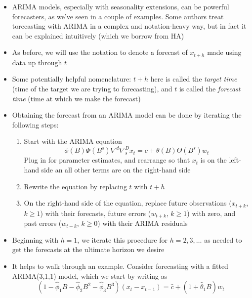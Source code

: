 \documentclass{article}
\begin{document}
\begin{itemize}
\item ARIMA models, especially with seasonality extensions, can be powerful 
  forecasters, as we've seen in a couple of examples. Some authors treat
  torecasting with ARIMA in a complex and notation-heavy way, but in fact it can
  be explained intuitively (which we borrow from HA)

\item As before, we will use the notation  to denote
  a forecast of $x_{t+h}$ made using data up through $t$

\item Some potentially helpful nomenclature: $t+h$ here is called the
  \emph{target time} (time of the target we are trying to forecasting), and $t$
  is called the \emph{forecast time} (time at which we make the forecast) 

\item Obtaining the forecast  from an ARIMA model can 
  be done by iterating the following steps: 

\begin{enumerate}
\item Start with the ARIMA equation
  \[
  \phi(B) \Phi(B^s) \nabla^d \nabla_s^D x_t = c + \theta(B) \Theta(B^s) w_t   
  \]
  Plug in for parameter estimates, and rearrange so that $x_t$ is on the
  left-hand side an all other terms are on the right-hand side 

\item Rewrite the equation by replacing $t$ with $t+h$

\item On the right-hand side of the equation, replace future observations
  ($x_{t+k}$, $k \geq 1$) with their forecasts, future errors ($w_{t+k}$, $k
  \geq 1$) with zero, and past errors ($w_{t-k}$, $k \geq 0$) with their ARIMA 
  residuals   
\end{enumerate}

\item Beginning with $h = 1$, we iterate this procedure for $h = 2,3,\dots$ as
  needed to get the forecasts at the ultimate horizon we desire  

\item It helps to walk through an example. Consider forecasting with a fitted 
  ARIMA(3,1,1) model, which we start by writing as
  \[
  (1 - \hat\phi_1 B - \hat\phi_2 B^2 - \hat\phi_3 B^3) (x_t - x_{t-1}) = \hat{c}
  + (1 + \hat\theta_1 B) w_t
  \]


\end{itemize}
\end{document}
